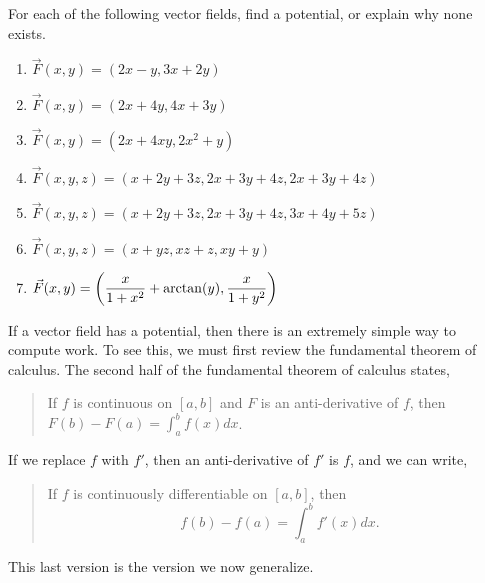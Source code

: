 \begin{problem}
%
For each of the following vector fields, find a potential, or explain why none exists.
\begin{enumerate}
 \item $\vec F(x,y)=(2x-y, 3x+2y)$
 \item $\vec F(x,y)=(2x+4y, 4x+3y)$
 \item $\vec F(x,y)=(2x+4xy, 2x^2+y)$
 \item $\vec F(x,y,z)=(x+2y+3z,2x+3y+4z,2x+3y+4z)$
 \item $\vec F(x,y,z)=(x+2y+3z,2x+3y+4z,3x+4y+5z)$
 \item $\vec F(x,y,z)=(x+yz,xz+z,xy+y)$
 \item $\displaystyle \vec F(x,y) = \left(\frac{x}{1+x^2}+\arctan (y),\frac{x}{1+y^2}\right)$
\end{enumerate}
\end{problem}


If a vector field has a potential, then there is an extremely simple way to compute work. To see this, we must first review the fundamental theorem of calculus. The second half of the fundamental theorem of calculus states,
\begin{quote}
 If $f$ is continuous on $[a,b]$ and $F$ is an anti-derivative of $f$, then $F(b)-F(a) = \int_a^b f(x) dx$.
\end{quote}
If we replace $f$ with $f'$, then an anti-derivative of $f'$ is $f$, and we can write,
\begin{quote}
 If $f$ is continuously differentiable on $[a,b]$, then $$f(b)-f(a)=\int_a^b f'(x) dx.$$
\end{quote}
This last version is the version we now generalize.

